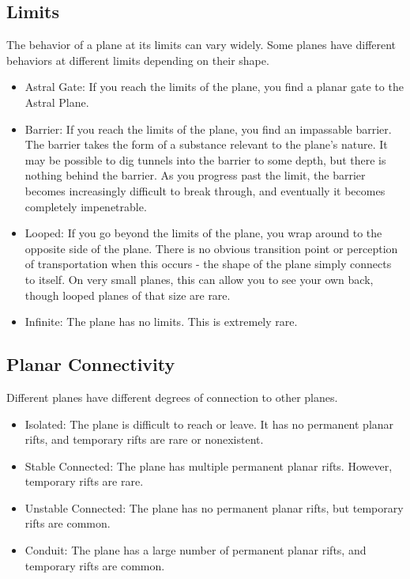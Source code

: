   \subsection{Limits} The behavior of a plane at its limits can vary widely.
    Some planes have different behaviors at different limits depending on their shape.
    \begin{itemize}
      \item Astral Gate: If you reach the limits of the plane, you find a planar gate to the Astral Plane.
      \item Barrier: If you reach the limits of the plane, you find an impassable barrier.
        The barrier takes the form of a substance relevant to the plane's nature.
        It may be possible to dig tunnels into the barrier to some depth, but there is nothing behind the barrier.
        As you progress past the limit, the barrier becomes increasingly difficult to break through, and eventually it becomes completely impenetrable.
      \item Looped: If you go beyond the limits of the plane, you wrap around to the opposite side of the plane.
        There is no obvious transition point or perception of transportation when this occurs - the shape of the plane simply connects to itself.
        On very small planes, this can allow you to see your own back, though looped planes of that size are rare.
      \item Infinite: The plane has no limits. This is extremely rare.
    \end{itemize}

  \subsection{Planar Connectivity}
    Different planes have different degrees of connection to other planes.
    \begin{itemize}
      \item Isolated: The plane is difficult to reach or leave.
        It has no permanent planar rifts, and temporary rifts are rare or nonexistent.
      \item Stable Connected: The plane has multiple permanent planar rifts.
        However, temporary rifts are rare.
      \item Unstable Connected: The plane has no permanent planar rifts, but temporary rifts are common.
      \item Conduit: The plane has a large number of permanent planar rifts, and temporary rifts are common.
    \end{itemize}

